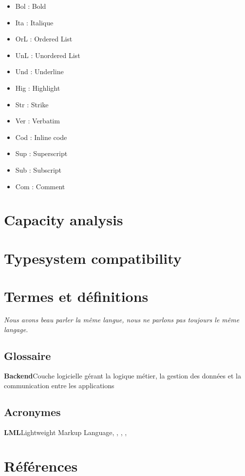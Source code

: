 \documentclass[a4paper,12pt]{article}
\begin{document}
\begin{tablenotes}
\begin{multicols}{3}\small
\begin{itemize}
  \item Bol : Bold
  \item Ita : Italique
  \item OrL : Ordered List
  \item UnL : Unordered List
  \item Und : Underline
  \item Hig : Highlight
  \item Str : Strike
  \item Ver : Verbatim
  \item Cod : Inline code
  \item Sup : Superscript
  \item Sub : Subscript
  \item Com : Comment
\end{itemize}
\end{multicols}
\end{tablenotes}
\section{Capacity analysis}
\label{sec:org9d29ef0}

\section{Typesystem compatibility}
\label{sec:orgdd03df3}
\section{Termes et définitions}
\label{sec:org1eb7196}
\emph{Nous avons beau parler la même langue, nous ne parlons pas toujours le même langage.}
\begin{multicols}{3}
\subsection{Glossaire}
\label{sec:org857aefb}
\textbf{\hypertarget{gls-5}{Backend}}\hspace*{1em}Couche logicielle gérant la logique métier, la gestion des données et la communication entre les applications\hspace*{.5em}\pageref{gls-2-use-1}
\subsection{Acronymes}
\label{sec:org5978807}
\textbf{\hypertarget{gls-206}{LML}}\hspace*{1em}Lightweight Markup Language\hspace*{.5em}\pageref{gls-1-use-1}, \pageref{gls-1-use-2}, \pageref{gls-1-use-3}, \pageref{gls-1-use-4}, \pageref{gls-1-use-5}

\end{multicols}
\section{Références}
\label{sec:org44c844f}
\printbibliography[heading=none]
\end{document}
